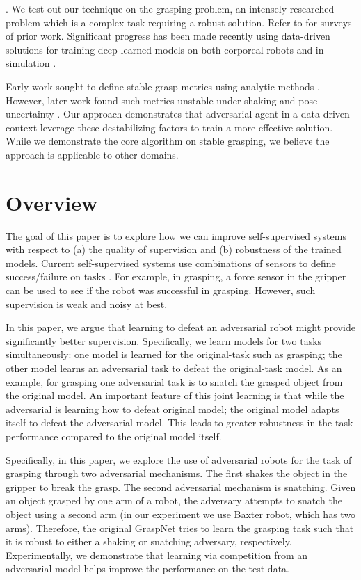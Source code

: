 \documentclass[letterpaper, 10 pt, conference]{ieeeconf}  %
\begin{document}
.
We test out our technique on the grasping problem, an intensely researched problem which is a complex task requiring a robust solution. Refer to \cite{bicchi2000robotic, bohg2014data} for surveys of prior work. Significant progress has been made recently using data-driven solutions for training deep learned models on both corporeal robots \cite{lenz2015deep, pinto2016supersizing, levine2016end, levine2016learning} and in simulation \cite{kappler2015leveraging, mahler2016dexnet}.  

Early work sought to define stable grasp metrics using analytic methods \cite{ferrari1992planning}. However, later work found such metrics unstable under shaking \cite{balasubramanian2012physical} and pose uncertainty \cite{weisz2012pose, kim2013physically}.  Our approach demonstrates that adversarial agent in a data-driven context leverage these destabilizing factors to train a more effective solution. While we demonstrate the core algorithm on stable grasping, we believe the approach is applicable to other domains.
\section{Overview}
The goal of this paper is to explore how we can improve self-supervised systems with respect to (a) the quality of supervision and (b) robustness of the trained models. Current self-supervised systems use combinations of sensors to define success/failure on tasks \cite{lenz2015deep, pinto2016supersizing, levine2016end, levine2016learning}. For example, in grasping, a force sensor in the gripper can be used to see if the robot was successful in grasping. However, such supervision is weak and noisy at best. 

In this paper, we argue that learning to defeat an adversarial robot might provide significantly better supervision. Specifically, we learn models for two tasks simultaneously: one model is learned for the original-task such as grasping; the other model learns an adversarial task to defeat the original-task model. As an example, for grasping one adversarial task is to snatch the grasped object from the original model. An important feature of this joint learning is that while the adversarial is learning how to defeat original model; the original model adapts itself to defeat the adversarial model. This leads to greater robustness in the task performance compared to the original model itself. 

Specifically, in this paper, we explore the use of adversarial robots for the task of grasping through two adversarial mechanisms. The first shakes the object in the gripper to break the grasp. The second adversarial mechanism is snatching. Given an object grasped by one arm of a robot, the adversary attempts to snatch the object using a second arm (in our experiment we use Baxter robot, which has two arms). Therefore, the original GraspNet tries to learn the grasping task such that it is robust to either a shaking or snatching adversary, respectively.
Experimentally, we demonstrate that learning via competition from an adversarial model helps improve the performance on the test data. 
\end{document}
